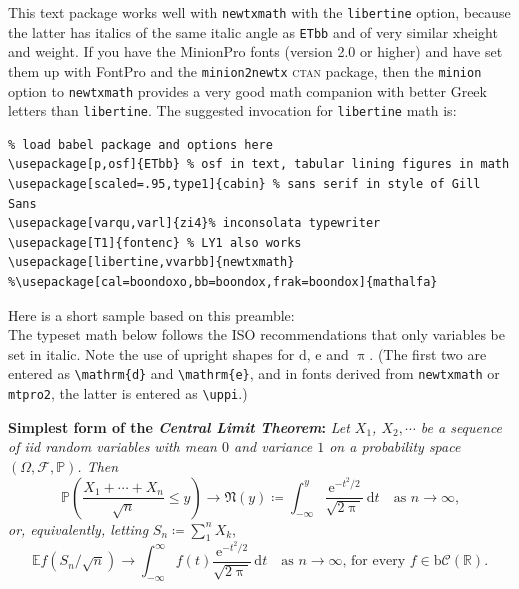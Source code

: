 \documentclass[11pt]{article}
\begin{document}
This text package works well with {\tt newtxmath} with the {\tt libertine} option, because the latter has italics of the same italic angle as {\tt ETbb} and of very similar xheight and weight. If you have the MinionPro fonts (version 2.0 or higher) and have set them up with \textsf{FontPro} and the {\tt minion2newtx} \textsc{ctan} package, then the {\tt minion} option to {\tt newtxmath} provides a very good math companion with better Greek letters than {\tt libertine}. The suggested invocation for {\tt libertine} math is:
\begin{verbatim}
% load babel package and options here
\usepackage[p,osf]{ETbb} % osf in text, tabular lining figures in math
\usepackage[scaled=.95,type1]{cabin} % sans serif in style of Gill Sans
\usepackage[varqu,varl]{zi4}% inconsolata typewriter
\usepackage[T1]{fontenc} % LY1 also works
\usepackage[libertine,vvarbb]{newtxmath}
%\usepackage[cal=boondoxo,bb=boondox,frak=boondox]{mathalfa}
\end{verbatim}
Here is a short sample based on this preamble:\\[4pt]
\def\Pr{\ensuremath{\mathbb{P}}}
\def\rmd{\mathrm{d}}
The typeset math below follows the ISO recommendations that only variables
be set in italic. Note the use of upright shapes for $\rmd$, $\mathrm{e}$
and $\uppi$. (The first two are entered as \verb|\mathrm{d}| and
\verb|\mathrm{e}|, and in fonts derived from {\tt newtxmath} or {\tt mtpro2},
 the latter is entered as \verb|\uppi|.)

\textbf{Simplest form of the \textit{Central Limit Theorem}:} \textit{Let
$X_1$, $X_2,\cdots$ be a sequence of iid random variables with mean $0$ 
and variance $1$ on a probability space $(\Omega,\mathcal{F},\Pr)$. Then}
\[\Pr\left(\frac{X_1+\cdots+X_n}{\sqrt{n}}\le y\right)\to\mathfrak{N}(y)\coloneq
\int_{-\infty}^y \frac{\mathrm{e}^{-t^2/2}}{\sqrt{2\uppi}}\,
\mathrm{d}t\quad\mbox{as $n\to\infty$,}\]
\textit{or, equivalently, letting} $S_n\coloneq\sum_1^n X_k$,
\[\mathbb{E} f(S_n/\sqrt{n})\to \int_{-\infty}^\infty f(t)
\frac{\mathrm{e}^{-t^2/2}}{\sqrt{2\uppi}}\,\mathrm{d}t
\quad\mbox{as $n\to\infty$, for every $f\in\mathrm{b}
\mathcal{C}(\mathbb{R})$.}\]

\end{document}
